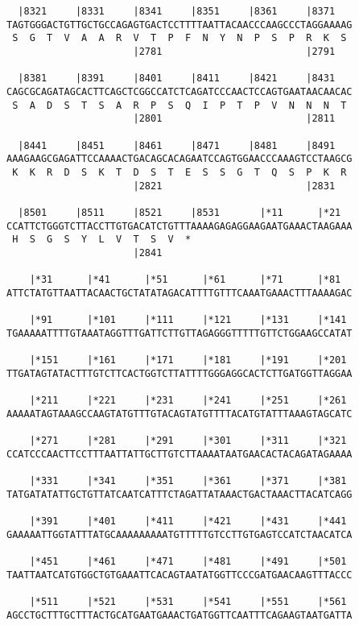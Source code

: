 \documentclass{article}
\begin{document}
\begin{Verbatim}
  |8321     |8331     |8341     |8351     |8361     |8371   
TAGTGGGACTGTTGCTGCCAGAGTGACTCCTTTTAATTACAACCCAAGCCCTAGGAAAAG
 S  G  T  V  A  A  R  V  T  P  F  N  Y  N  P  S  P  R  K  S 
                      |2781                         |2791   
  
  |8381     |8391     |8401     |8411     |8421     |8431   
CAGCGCAGATAGCACTTCAGCTCGGCCATCTCAGATCCCAACTCCAGTGAATAACAACAC
 S  A  D  S  T  S  A  R  P  S  Q  I  P  T  P  V  N  N  N  T 
                      |2801                         |2811   
  
  |8441     |8451     |8461     |8471     |8481     |8491   
AAAGAAGCGAGATTCCAAAACTGACAGCACAGAATCCAGTGGAACCCAAAGTCCTAAGCG
 K  K  R  D  S  K  T  D  S  T  E  S  S  G  T  Q  S  P  K  R 
                      |2821                         |2831   
  
  |8501     |8511     |8521     |8531       |*11      |*21  
CCATTCTGGGTCTTACCTTGTGACATCTGTTTAAAAGAGAGGAAGAATGAAACTAAGAAA
 H  S  G  S  Y  L  V  T  S  V  *   
                      |2841                                 
  
    |*31      |*41      |*51      |*61      |*71      |*81  
ATTCTATGTTAATTACAACTGCTATATAGACATTTTGTTTCAAATGAAACTTTAAAAGAC
  
    |*91      |*101     |*111     |*121     |*131     |*141 
TGAAAAATTTTGTAAATAGGTTTGATTCTTGTTAGAGGGTTTTTGTTCTGGAAGCCATAT
  
    |*151     |*161     |*171     |*181     |*191     |*201 
TTGATAGTATACTTTGTCTTCACTGGTCTTATTTTGGGAGGCACTCTTGATGGTTAGGAA
  
    |*211     |*221     |*231     |*241     |*251     |*261 
AAAAATAGTAAAGCCAAGTATGTTTGTACAGTATGTTTTACATGTATTTAAAGTAGCATC
  
    |*271     |*281     |*291     |*301     |*311     |*321 
CCATCCCAACTTCCTTTAATTATTGCTTGTCTTAAAATAATGAACACTACAGATAGAAAA
  
    |*331     |*341     |*351     |*361     |*371     |*381 
TATGATATATTGCTGTTATCAATCATTTCTAGATTATAAACTGACTAAACTTACATCAGG
  
    |*391     |*401     |*411     |*421     |*431     |*441 
GAAAAATTGGTATTTATGCAAAAAAAAATGTTTTTGTCCTTGTGAGTCCATCTAACATCA
  
    |*451     |*461     |*471     |*481     |*491     |*501 
TAATTAATCATGTGGCTGTGAAATTCACAGTAATATGGTTCCCGATGAACAAGTTTACCC
  
    |*511     |*521     |*531     |*541     |*551     |*561 
AGCCTGCTTTGCTTTACTGCATGAATGAAACTGATGGTTCAATTTCAGAAGTAATGATTA
  

\end{Verbatim}
\end{document}
